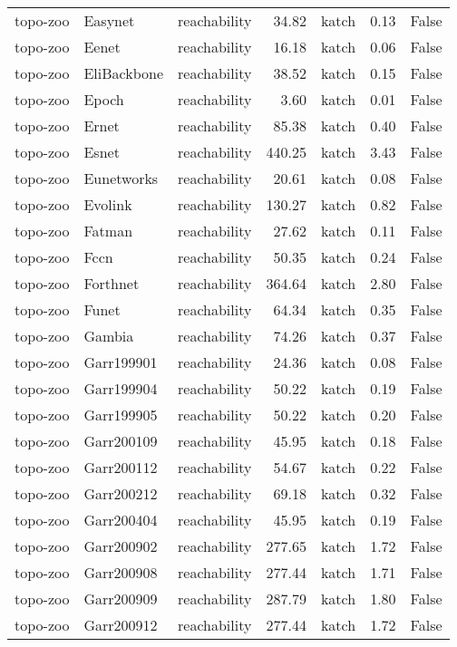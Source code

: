 \begin{tabular}{lllrlrr}
topo-zoo & Easynet & reachability & 34.82 & katch & 0.13 & False \\
topo-zoo & Eenet & reachability & 16.18 & katch & 0.06 & False \\
topo-zoo & EliBackbone & reachability & 38.52 & katch & 0.15 & False \\
topo-zoo & Epoch & reachability & 3.60 & katch & 0.01 & False \\
topo-zoo & Ernet & reachability & 85.38 & katch & 0.40 & False \\
topo-zoo & Esnet & reachability & 440.25 & katch & 3.43 & False \\
topo-zoo & Eunetworks & reachability & 20.61 & katch & 0.08 & False \\
topo-zoo & Evolink & reachability & 130.27 & katch & 0.82 & False \\
topo-zoo & Fatman & reachability & 27.62 & katch & 0.11 & False \\
topo-zoo & Fccn & reachability & 50.35 & katch & 0.24 & False \\
topo-zoo & Forthnet & reachability & 364.64 & katch & 2.80 & False \\
topo-zoo & Funet & reachability & 64.34 & katch & 0.35 & False \\
topo-zoo & Gambia & reachability & 74.26 & katch & 0.37 & False \\
topo-zoo & Garr199901 & reachability & 24.36 & katch & 0.08 & False \\
topo-zoo & Garr199904 & reachability & 50.22 & katch & 0.19 & False \\
topo-zoo & Garr199905 & reachability & 50.22 & katch & 0.20 & False \\
topo-zoo & Garr200109 & reachability & 45.95 & katch & 0.18 & False \\
topo-zoo & Garr200112 & reachability & 54.67 & katch & 0.22 & False \\
topo-zoo & Garr200212 & reachability & 69.18 & katch & 0.32 & False \\
topo-zoo & Garr200404 & reachability & 45.95 & katch & 0.19 & False \\
topo-zoo & Garr200902 & reachability & 277.65 & katch & 1.72 & False \\
topo-zoo & Garr200908 & reachability & 277.44 & katch & 1.71 & False \\
topo-zoo & Garr200909 & reachability & 287.79 & katch & 1.80 & False \\
topo-zoo & Garr200912 & reachability & 277.44 & katch & 1.72 & False \\

\end{tabular}

